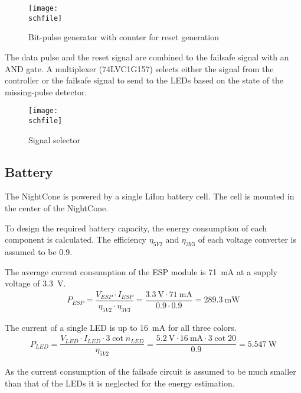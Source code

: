 \begin{figure}[h!]
    \centering
    \texttt{[image: \\schfile]}
    \caption{Bit-pulse generator with counter for reset generation}
    \label{fig_failsafe_bit_counter}
\end{figure}

The data pulse and the reset signal are combined to the failsafe signal with an AND gate. A multiplexer (74LVC1G157) selects either the signal from the controller or the failsafe signal to send to the \acp{LED} based on the state of the missing-pulse detector. 

\begin{figure}[h!]
    \centering
    \texttt{[image: \\schfile]}
    \caption{Signal selector}
    \label{fig_failsafe_mux}
\end{figure}

\FloatBarrier

\subsection{Battery}
\label{battery}
The NightCone is powered by a single \ac{LiIon} battery cell. The cell is mounted in the center of the NightCone. 

To design the required battery capacity, the energy consumption of each component is calculated. The efficiency $\eta_{5V2}$ and $\eta_{3V3}$ of each voltage converter is assumed to be 0.9. 

The average current consumption of the ESP module is \SI{71}{\milli\ampere} at a supply voltage of \SI{3.3}{\volt}. \cite{AIThinker:ESP_12F}
\begin{align}
    P_{ESP} = \dfrac{V_{ESP} \cdot I_{ESP}}{\eta_{5V2} \cdot \eta_{3V3}} = \dfrac{\SI{3.3}{\volt} \cdot \SI{71}{\milli\ampere}}{0.9 \cdot 0.9} = \SI{289.3}{\milli\watt}
\end{align}

The current of a single \ac{LED} is up to \SI{16}{\milli\ampere} for all three colors. \cite{Worldsemi:WS2813E}
\begin{align}
    P_{LED} = \dfrac{V_{LED} \cdot I_{LED} \cdot 3 \cot n_{LED}}{\eta_{5V2}} = \dfrac{\SI{5.2}{\volt} \cdot \SI{16}{\milli\ampere} \cdot 3 \cot 20}{0.9} = \SI{5.547}{\watt}
\end{align}

As the current consumption of the failsafe circuit is assumed to be much smaller than that of the \acp{LED} it is neglected for the energy estimation. 

